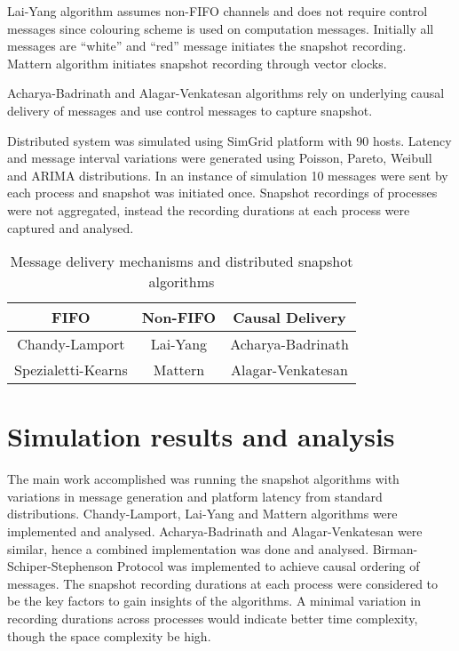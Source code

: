 \documentclass[12pt]{article}
\begin{document}
Lai-Yang algorithm assumes non-FIFO channels and does not require control messages since colouring scheme is used on computation messages. Initially all messages are ``white'' and ``red'' message initiates the snapshot recording. Mattern algorithm initiates snapshot recording through vector clocks.

Acharya-Badrinath and Alagar-Venkatesan algorithms rely on underlying causal delivery of messages and use control messages to capture snapshot.

Distributed system was simulated using SimGrid platform with 90 hosts. Latency and message interval variations were generated using Poisson, Pareto, Weibull and ARIMA distributions. In an instance of simulation 10 messages were sent by each process and snapshot was initiated once. Snapshot recordings of processes were not aggregated, instead the recording durations at each process were captured and analysed.

\begin{table}[!htb]
\centering
\caption{Message delivery mechanisms and distributed snapshot algorithms}
\begin{tabular}{ccc}
\toprule FIFO & Non-FIFO & Causal Delivery\\
\midrule Chandy-Lamport \cite{cl:seminal} & Lai-Yang \cite{ly:coloring} & Acharya-Badrinath \cite{ab:causal}\\ Spezialetti-Kearns \cite{sk:optcl} & Mattern \cite{mat:vclks} & Alagar-Venkatesan \cite{av:causal}\\
\bottomrule
\end{tabular}
\end{table}

\section{Simulation results and analysis}

The main work accomplished was running the snapshot algorithms with variations in message generation and platform latency from standard distributions. Chandy-Lamport, Lai-Yang and Mattern algorithms were implemented and analysed.  Acharya-Badrinath and Alagar-Venkatesan were similar, hence a combined implementation was done and analysed. Birman-Schiper-Stephenson Protocol was implemented to achieve causal ordering of messages. The snapshot recording durations at each process were considered to be the key factors to gain insights of the algorithms. A minimal variation in recording durations across processes would indicate better time complexity, though the space complexity be high.
\end{document}
